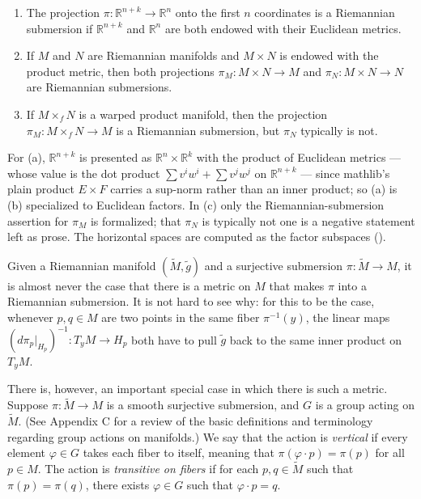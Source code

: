 \begin{example}
\label{ex:riemannian-submersions}
\leanok
{}
\begin{enumerate}
\item[(a)] The projection $\pi: \mathbb{R}^{n+k} \to \mathbb{R}^n$ onto the first $n$ coordinates is a Riemannian submersion if $\mathbb{R}^{n+k}$ and $\mathbb{R}^n$ are both endowed with their Euclidean metrics.
\item[(b)] If $M$ and $N$ are Riemannian manifolds and $M \times N$ is endowed with the product metric, then both projections $\pi_M: M \times N \to M$ and $\pi_N: M \times N \to N$ are Riemannian submersions.
\item[(c)] If $M \times_f N$ is a warped product manifold, then the projection $\pi_M : M \times_f N \to M$ is a Riemannian submersion, but $\pi_N$ typically is not.
\end{enumerate}
For (a), $\mathbb{R}^{n+k}$ is presented as $\mathbb{R}^n \times \mathbb{R}^k$ with the product of Euclidean metrics --- whose value is the dot product $\sum v^i w^i + \sum v^j w^j$ on $\mathbb{R}^{n+k}$ --- since mathlib's plain product $E \times F$ carries a sup-norm rather than an inner product; so (a) is (b) specialized to Euclidean factors. In (c) only the Riemannian-submersion assertion for $\pi_M$ is formalized; that $\pi_N$ is typically not one is a negative statement left as prose. The horizontal spaces are computed as the factor subspaces ().
\end{example}

Given a Riemannian manifold $(\tilde{M}, \tilde{g})$ and a surjective submersion $\pi: \tilde{M} \to M$, it is almost never the case that there is a metric on $M$ that makes $\pi$ into a Riemannian submersion. It is not hard to see why: for this to be the case, whenever $p, q \in M$ are two points in the same fiber $\pi^{-1}(y)$, the linear maps $(d\pi_p|_{H_p})^{-1}: T_y M \to H_p$ both have to pull $\tilde{g}$ back to the same inner product on $T_y M$.

There is, however, an important special case in which there is such a metric. Suppose $\pi: \tilde{M} \to M$ is a smooth surjective submersion, and $G$ is a group acting on $\tilde{M}$. (See Appendix C for a review of the basic definitions and terminology regarding group actions on manifolds.) We say that the action is \emph{vertical} if every element $\varphi \in G$ takes each fiber to itself, meaning that $\pi(\varphi \cdot p) = \pi(p)$ for all $p \in M$. The action is \emph{transitive on fibers} if for each $p, q \in \tilde{M}$ such that $\pi(p) = \pi(q)$, there exists $\varphi \in G$ such that $\varphi \cdot p = q$.

